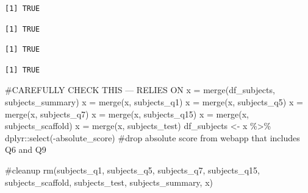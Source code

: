 \documentclass[
  letterpaper,
  DIV=11,
  numbers=noendperiod]{scrreprt}
\newenvironment{Shaded}{\begin{snugshade}}{\end{snugshade}}
\newcommand{\CommentTok}[1]{\textcolor[rgb]{0.37,0.37,0.37}{#1}}
\newcommand{\FunctionTok}[1]{\textcolor[rgb]{0.28,0.35,0.67}{#1}}
\newcommand{\NormalTok}[1]{\textcolor[rgb]{0.00,0.23,0.31}{#1}}
\newcommand{\OtherTok}[1]{\textcolor[rgb]{0.00,0.23,0.31}{#1}}
\newcommand{\SpecialCharTok}[1]{\textcolor[rgb]{0.37,0.37,0.37}{#1}}
\begin{document}
\begin{verbatim}
[1] TRUE
\end{verbatim}

\begin{Shaded}
\end{Shaded}

\begin{verbatim}
[1] TRUE
\end{verbatim}

\begin{Shaded}
\end{Shaded}

\begin{verbatim}
[1] TRUE
\end{verbatim}

\begin{Shaded}
\end{Shaded}

\begin{verbatim}
[1] TRUE
\end{verbatim}

\begin{Shaded}
\begin{Highlighting}[]
\CommentTok{\#CAREFULLY CHECK THIS — RELIES ON }
\NormalTok{x }\OtherTok{=} \FunctionTok{merge}\NormalTok{(df\_subjects, subjects\_summary)}
\NormalTok{x }\OtherTok{=} \FunctionTok{merge}\NormalTok{(x, subjects\_q1)}
\NormalTok{x }\OtherTok{=} \FunctionTok{merge}\NormalTok{(x, subjects\_q5)}
\NormalTok{x }\OtherTok{=} \FunctionTok{merge}\NormalTok{(x, subjects\_q7)}
\NormalTok{x }\OtherTok{=} \FunctionTok{merge}\NormalTok{(x, subjects\_q15)}
\NormalTok{x }\OtherTok{=} \FunctionTok{merge}\NormalTok{(x, subjects\_scaffold)}
\NormalTok{x }\OtherTok{=} \FunctionTok{merge}\NormalTok{(x, subjects\_test)}
\NormalTok{df\_subjects }\OtherTok{\textless{}{-}}\NormalTok{ x }\SpecialCharTok{\%\textgreater{}\%}\NormalTok{ dplyr}\SpecialCharTok{::}\FunctionTok{select}\NormalTok{(}\SpecialCharTok{{-}}\NormalTok{absolute\_score) }\CommentTok{\#drop absolute score from webapp that includes Q6 and Q9}

\CommentTok{\#cleanup}
\FunctionTok{rm}\NormalTok{(subjects\_q1, subjects\_q5, subjects\_q7, subjects\_q15, subjects\_scaffold, subjects\_test, subjects\_summary, x)}
\end{Highlighting}
\end{Shaded}
\end{document}
